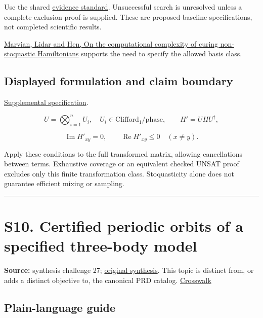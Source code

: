 \documentclass[
  11pt,
]{article}
\begin{document}
Use the shared
\href{https://github.com/rick-stevens-ai/Pure-Thought/blob/main/reviews/EVIDENCE-STANDARD.md}{evidence
standard}. Unsuccessful search is unresolved unless a complete exclusion
proof is supplied. These are proposed baseline specifications, not
completed scientific results.

\href{https://pmc.ncbi.nlm.nih.gov/articles/PMC6450938/}{Marvian, Lidar
and Hen, On the computational complexity of curing non-stoquastic
Hamiltonians} supports the need to specify the allowed basis class.

\subsection{Displayed formulation and claim boundary}

\href{https://github.com/rick-stevens-ai/Pure-Thought/blob/main/supplemental/S09.md}{Supplemental
specification}.

\[U=\bigotimes_{i=1}^nU_i,\quad U_i\in\mathrm{Clifford}_1/\mathrm{phase},
\qquad H'=UHU^\dagger,\]

\[\operatorname{Im}H'_{xy}=0,\qquad\operatorname{Re}H'_{xy}\le0\quad(x\ne y).\]

Apply these conditions to the full transformed matrix, allowing
cancellations between terms. Exhaustive coverage or an equivalent
checked UNSAT proof excludes only this finite transformation class.
Stoquasticity alone does not guarantee efficient mixing or sampling.

\begin{center}\rule{0.5\linewidth}{0.5pt}\end{center}

\section{S10. Certified periodic orbits of a specified three-body model}

\textbf{Source:} synthesis challenge 27;
\href{https://github.com/rick-stevens-ai/Pure-Thought/blob/main/NOTES/30-Most-Compelling-Pure-Thought-AI-Challenges.md}{original
synthesis}. This topic is distinct from, or adds a distinct objective
to, the canonical PRD catalog.
\href{https://github.com/rick-stevens-ai/Pure-Thought/blob/main/reviews/SYNTHESIS-CROSSWALK.md}{Crosswalk}

\subsection{Plain-language guide}
\end{document}
